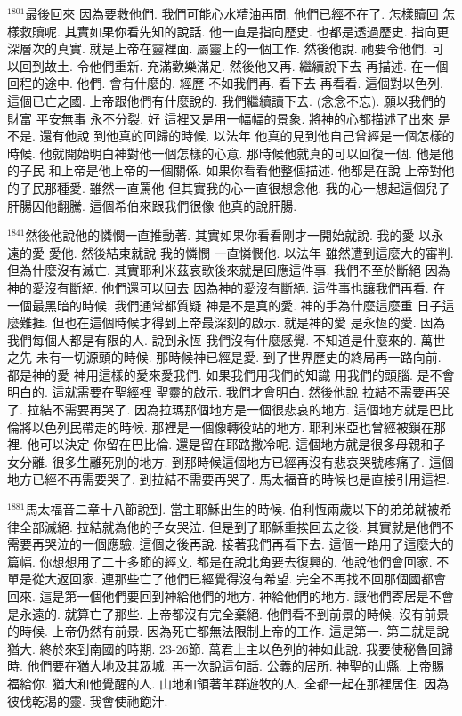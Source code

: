 \documentclass{book}
\begin{document}
$^{1801}$最後回來 因為要救他們.
我們可能心水精油再問.
他們已經不在了.
怎樣贖回 怎樣救贖呢.
其實如果你看先知的說話.
他一直是指向歷史.
也都是透過歷史.
指向更深層次的真實.
就是上帝在靈裡面.
屬靈上的一個工作.
然後他說.
祂要令他們.
可以回到故土.
令他們重新.
充滿歡樂滿足.
然後他又再.
繼續說下去 再描述.
在一個回程的途中.
他們.
會有什麼的.
經歷 不如我們再.
看下去 再看看.
這個對以色列.
這個已亡之國.
上帝跟他們有什麼說的.
我們繼續讀下去.
(念念不忘).
願以我們的財富 平安無事 永不分裂.
好 這裡又是用一幅幅的景象.
將神的心都描述了出來 是不是.
還有他說 到他真的回歸的時候.
以法年 他真的見到他自己曾經是一個怎樣的時候.
他就開始明白神對他一個怎樣的心意.
那時候他就真的可以回復一個.
他是他的子民 和上帝是他上帝的一個關係.
如果你看看他整個描述.
他都是在說 上帝對他的子民那種愛.
雖然一直罵他 但其實我的心一直很想念他.
我的心一想起這個兒子 肝腸因他翻騰.
這個希伯來跟我們很像 他真的說肝腸.

$^{1841}$然後他說他的憐憫一直推動著.
其實如果你看看剛才一開始就說.
我的愛 以永遠的愛 愛他.
然後結束就說 我的憐憫 一直憐憫他.
以法年 雖然遭到這麼大的審判.
但為什麼沒有滅亡.
其實耶利米茲哀歌後來就是回應這件事.
我們不至於斷絕 因為神的愛沒有斷絕.
他們還可以回去 因為神的愛沒有斷絕.
這件事也讓我們再看.
在一個最黑暗的時候.
我們通常都質疑 神是不是真的愛.
神的手為什麼這麼重 日子這麼難捱.
但也在這個時候才得到上帝最深刻的啟示.
就是神的愛 是永恆的愛.
因為我們每個人都是有限的人.
說到永恆 我們沒有什麼感覺.
不知道是什麼來的.
萬世之先 未有一切源頭的時候.
那時候神已經是愛.
到了世界歷史的終局再一路向前.
都是神的愛 神用這樣的愛來愛我們.
如果我們用我們的知識 用我們的頭腦.
是不會明白的.
這就需要在聖經裡 聖靈的啟示.
我們才會明白.
然後他說 拉結不需要再哭了.
拉結不需要再哭了.
因為拉瑪那個地方是一個很悲哀的地方.
這個地方就是巴比倫將以色列民帶走的時候.
那裡是一個像轉役站的地方.
耶利米亞也曾經被鎖在那裡.
他可以決定 你留在巴比倫.
還是留在耶路撒冷呢.
這個地方就是很多母親和子女分離.
很多生離死別的地方.
到那時候這個地方已經再沒有悲哀哭號疼痛了.
這個地方已經不再需要哭了.
到拉結不需要再哭了.
馬太福音的時候也是直接引用這裡.

$^{1881}$馬太福音二章十八節說到.
當主耶穌出生的時候.
伯利恆兩歲以下的弟弟就被希律全部滅絕.
拉結就為他的子女哭泣.
但是到了耶穌重挨回去之後.
其實就是他們不需要再哭泣的一個應驗.
這個之後再說.
接著我們再看下去.
這個一路用了這麼大的篇幅.
你想想用了二十多節的經文.
都是在說北角要去復興的.
他說他們會回家.
不單是從大返回家.
連那些亡了他們已經覺得沒有希望.
完全不再找不回那個國都會回來.
這是第一個他們要回到神給他們的地方.
神給他們的地方.
讓他們寄居是不會是永遠的.
就算亡了那些.
上帝都沒有完全棄絕.
他們看不到前景的時候.
沒有前景的時候.
上帝仍然有前景.
因為死亡都無法限制上帝的工作.
這是第一.
第二就是說猶大.
終於來到南國的時期.
23-26節.
萬君上主以色列的神如此說.
我要使秘魯回歸時.
他們要在猶大地及其眾城.
再一次說這句話.
公義的居所.
神聖的山縣.
上帝賜福給你.
猶大和他覺醒的人.
山地和領著羊群遊牧的人.
全都一起在那裡居住.
因為彼伐乾渴的靈.
我會使祂飽汁.
\end{document}
